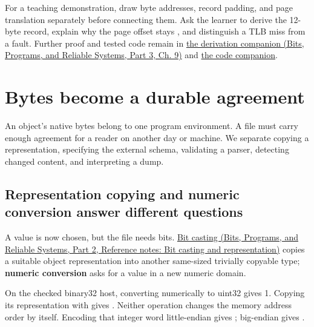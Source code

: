 For a teaching demonstration, draw byte addresses, record padding, and page translation separately before connecting them. Ask the learner to derive the 12-byte record, explain why the page offset stays , and distinguish a TLB miss from a fault. Further proof and tested code remain in \href{../01-Bits-Programs-and-Reliable-Systems-P03/main.pdf\#nameddest=01-foundations-i-ch011-m003---byte-order-layout-and-translation}{the derivation companion (Bits, Programs, and Reliable Systems, Part 3, Ch. 9)} and \hyperref[appendix-4e2236f53445-m003---explicit-byte-codecs-and-checked-alignment]{the code companion}.

\section{Bytes become a durable agreement}\label{05-engine-i-ch002-bytes-become-a-durable-agreement}

\hypertarget{05-engine-i-ch002-bytes-become-a-durable-agreement}{}

An object's native bytes belong to one program environment. A file must carry enough agreement for a reader on another day or machine. We separate copying a representation, specifying the external schema, validating a parser, detecting changed content, and interpreting a dump.

\subsection{Representation copying and numeric conversion answer different questions}\label{05-engine-i-ch002-representation-copying-and-numeric-conversion-answer-different-questions}

\hypertarget{05-engine-i-ch002-representation-copying-and-numeric-conversion-answer-different-questions}{}

A value is now chosen, but the file needs bits. \href{../01-Bits-Programs-and-Reliable-Systems-P02/main.pdf\#nameddest=appendix-34ee45f161c1}{Bit casting (Bits, Programs, and Reliable Systems, Part 2, Reference notes: Bit casting and representation)} copies a suitable object representation into another same-sized trivially copyable type; \textbf{numeric conversion} asks for a value in a new numeric domain.

On the checked binary32 host, converting  numerically to uint32 gives 1. Copying its representation with  gives . Neither operation changes the memory address order by itself. Encoding that integer word little-endian gives ; big-endian gives .

